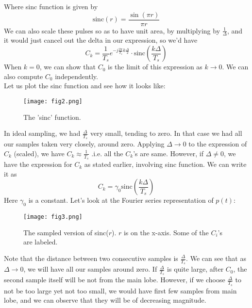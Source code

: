 Where sinc function is given by
\begin{equation}
\text{sinc}(r)=\frac{\sin(\pi r)}{\pi r}\nonumber
\end{equation}
We can also scale these pulses so as to have unit area, by multiplying by $\frac{1}{\Delta}$, and it would just cancel out the delta in our expression, so we'd have 
\begin{equation}
C_{k}=\frac{1}{T_{s}}e^{-j\frac{2\pi}{T_{s}}k\frac{\Delta}{2}}\cdot \text{sinc}\left(\frac{k\Delta}{T_{s}}\right)\nonumber
\end{equation}
When $k=0$, we can show that $C_{0}$ is the limit of this expression as $k\rightarrow0$. We can also compute $C_{0}$ independently.\\
Let us plot the sinc function and see how it looks like:\\
\begin{figure}[htb]
\centering
\texttt{[image: fig2.png]}
\caption{The 'sinc' function.}
\end{figure}
In ideal sampling, we had $\frac{\Delta}{T_{s}}$ very small, tending to zero. In that case we had all our samples taken very closely, around zero. Applying $\Delta\rightarrow0$ to the expression of $C_{k}$ (scaled), we have $C_{k}\approx\frac{1}{T_{s}}$ .i.e. all the $C_{k}$'s are same. However, if $\Delta\ne0$, we have the expression for $C_{k}$ as stated earlier, involving sinc function. We can write it as 
\begin{equation}
C_{k}=\gamma_0\text{sinc}\left(\frac{k\Delta}{T_{s}}\right)\nonumber
\end{equation}
Here $\gamma_0$ is a constant. Let's look at the Fourier series representation of $p(t)$:
\begin{figure}[htb]
\centering
\texttt{[image: fig3.png]}
\caption{The sampled version of sinc($r$). $r$ is on the x-axis. Some of the $C_{i}$'s are labeled.}
\end{figure}
Note that the distance between two consecutive samples is $\frac{\Delta}{T_{s}}$. We can see that as $\Delta\rightarrow0$, we will have all our samples around zero. If $\frac{\Delta}{T_{s}}$ is quite large, after $C_{0}$, the second sample itself will be not from the main lobe. However, if we choose $\frac{\Delta}{T_{s}}$ to not be too large yet not too small, we would have first few samples from main lobe, and we can observe that they will be of decreasing magnitude.
